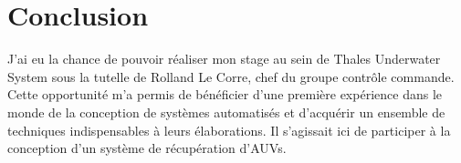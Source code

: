 \chapter{Conclusion}
\label{Conclusion}
\thispagestyle{fancy}

J'ai eu la chance de pouvoir réaliser mon stage au sein de Thales Underwater System sous la tutelle de Rolland Le Corre, chef du groupe contrôle commande. Cette opportunité m’a permis de bénéficier d’une première expérience dans le monde de la conception de systèmes automatisés et d’acquérir un ensemble de techniques indispensables à leurs élaborations. Il s’agissait ici de participer à la conception d’un système de récupération d’AUVs.